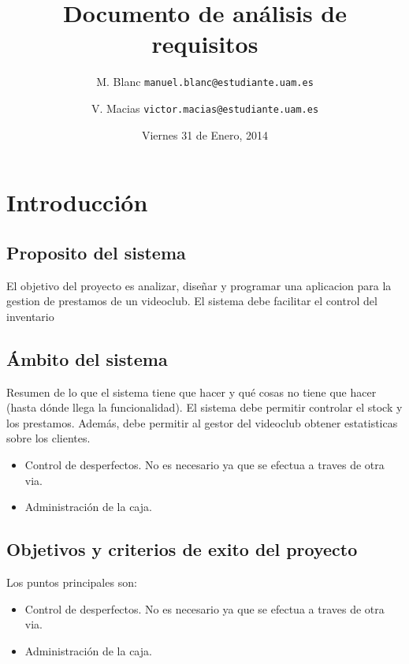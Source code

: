\documentclass[a4paper, 12pt]{article}
\title{Documento de análisis de requisitos}
\author{M. Blanc \texttt{manuel.blanc@estudiante.uam.es} \and V. Macias \texttt{victor.macias@estudiante.uam.es}}
\date{Viernes 31 de Enero, 2014}
\begin{document}
	\clearpage\maketitle
	\thispagestyle{empty}
	\tableofcontents

\section{Introducción}

\subsection{Proposito del sistema}
El objetivo del proyecto es analizar, diseñar y programar una aplicacion para la gestion de prestamos de un videoclub. El sistema debe facilitar el control del inventario

\subsection{Ámbito del sistema}
Resumen de lo que el sistema tiene que hacer y qué cosas no tiene que hacer (hasta dónde llega la funcionalidad).
El sistema debe permitir controlar el stock y los prestamos. Además, debe permitir al gestor del videoclub obtener estatisticas sobre los clientes.

\begin{itemize}
	\item Control de desperfectos. No es necesario ya que se efectua a traves de otra via.
	\item Administración de la caja.
\end{itemize}

\subsection{Objetivos y criterios de exito del proyecto}
Los puntos principales son:
\begin{itemize}
	\item Control de desperfectos. No es necesario ya que se efectua a traves de otra via.
	\item Administración de la caja.
\end{itemize}
\end{document}
